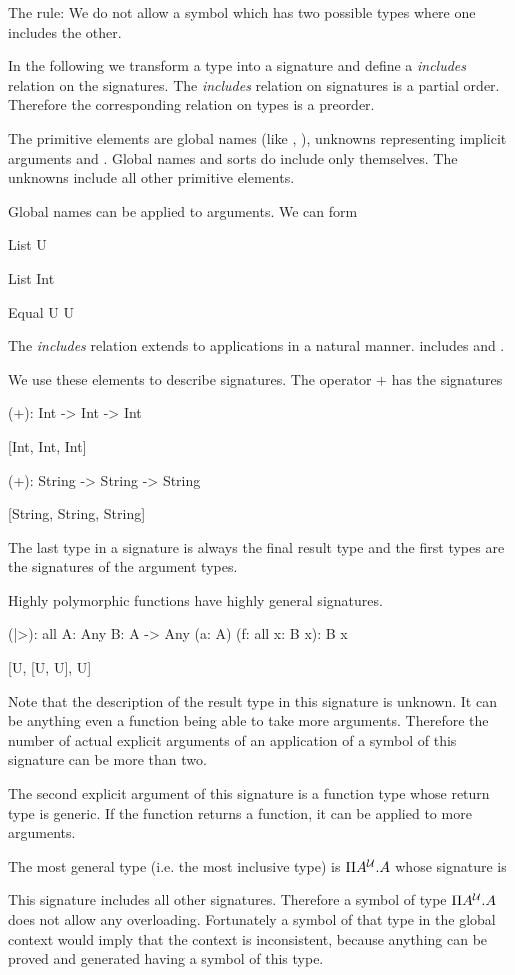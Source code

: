 The rule: We do not allow a symbol which has two possible types where one
includes the other.

In the following we transform a type into a signature and define a
\emph{includes} relation on the signatures. The \emph{includes} relation on
signatures is a partial order. Therefore the corresponding relation on types is
a preorder.

The primitive elements are global names (like , ), unknowns
 representing implicit arguments and . Global names and sorts
do include only themselves. The unknowns include all other primitive elements.

Global names can be applied to arguments. We can form
\begin{alba}
    List U

    List Int

    Equal U U \end{alba}
%
The \emph{includes} relation extends to applications in a natural manner.
 includes  and .

We use these elements to describe signatures. The operator $+$ has the
signatures
%
\begin{alba}
    (+): Int -> Int -> Int

        [Int, Int, Int]


    (+): String -> String -> String

        [String, String, String]
\end{alba}
%
The last type in a signature is always the final result type and the first types
are the signatures of the argument types.


Highly polymorphic functions have highly general signatures.
%
\begin{alba}
    (|>): all {A: Any} {B: A -> Any} (a: A) (f: all {x}: B x): B x

        [U, [U, U], U]
\end{alba}
%
Note that the description of the result type in this signature is unknown. It
can be anything even a function being able to take more arguments. Therefore the
number of actual explicit arguments of an application of a symbol of this
signature can be more than two.

The second explicit argument of this signature is a function type whose return
type is generic. If the function returns a function, it can be applied to more
arguments.

The most general type (i.e. the most inclusive type) is $\Pi A^{\cal{U}}. A$ whose
signature is
\begin{alba}
    [U]
\end{alba}
%
This signature includes all other signatures. Therefore a symbol of type $\Pi
A^{\cal{U}}. A$ does not allow any overloading. Fortunately a symbol of that type in
the global context would imply that the context is inconsistent, because
anything can be proved and generated having a symbol of this type.

